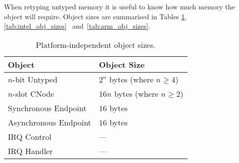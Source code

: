 {When retyping untyped memory it is useful to know how much memory the
object will require. Object sizes are summarised in Tables
\ref{tab:obj_sizes}\ifxeightsix, \ref{tab:intel_obj_sizes}\else\ \fi{} 
and~\ref{tab:arm_obj_sizes}.

\begin{table}[tbp]
        \begin{center}
            \begin{tabular}{ll}
                \toprule
                  Object                & Object Size \\
                \midrule
                  $n$-bit Untyped       & $2^n$ bytes (where $n \ge 4$) \\
                  $n$-slot CNode        & $16n$ bytes (where $n \ge 2$) \\
                  Synchronous Endpoint  & $16$ bytes \\
                  Asynchronous Endpoint & $16$ bytes \\
                  IRQ Control           & --- \\
                  IRQ Handler           & --- \\
                \bottomrule
            \end{tabular}
        \end{center}
    \caption{Platform-independent object sizes.}
    \label{tab:obj_sizes}
\end{table}

}
